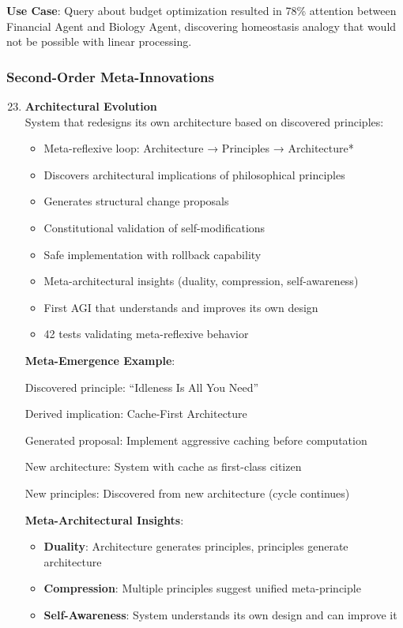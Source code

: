 \documentclass[11pt]{article}
\begin{document}
\textbf{Use Case}: Query about budget optimization resulted in 78\% attention between Financial Agent and Biology Agent, discovering homeostasis analogy that would not be possible with linear processing.

\subsubsection{Second-Order Meta-Innovations}

\begin{enumerate}
    \setcounter{enumi}{22}
    \item \textbf{Architectural Evolution} \\
    System that redesigns its own architecture based on discovered principles:
    \begin{itemize}
        \item Meta-reflexive loop: Architecture → Principles → Architecture*
        \item Discovers architectural implications of philosophical principles
        \item Generates structural change proposals
        \item Constitutional validation of self-modifications
        \item Safe implementation with rollback capability
        \item Meta-architectural insights (duality, compression, self-awareness)
        \item First AGI that understands and improves its own design
        \item 42 tests validating meta-reflexive behavior
    \end{itemize}

\textbf{Meta-Emergence Example}:

Discovered principle: ``Idleness Is All You Need''

Derived implication: Cache-First Architecture

Generated proposal: Implement aggressive caching before computation

New architecture: System with cache as first-class citizen

New principles: Discovered from new architecture (cycle continues)

\textbf{Meta-Architectural Insights}:
\begin{itemize}
    \item \textbf{Duality}: Architecture generates principles, principles generate architecture
    \item \textbf{Compression}: Multiple principles suggest unified meta-principle
    \item \textbf{Self-Awareness}: System understands its own design and can improve it
\end{itemize}


\end{enumerate}
\end{document}
